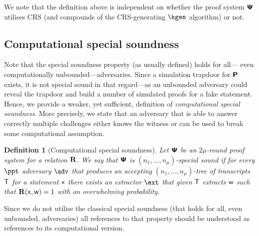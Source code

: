 \let\accentvec\vec \documentclass[runningheads,10pt]{llncs}
\newtheorem{definition}[theorem]{Definition}
\begin{document}
We note that the definition above is independent on whether the proof system $\bm{\mathsf{\Psi}}$ utilises CRS (and compounds of the CRS-generating $\kgen$ algorithm) or not.

\subsection{Computational special soundness}
Note that the special soundness property (as usually defined) holds for all--- even computationally unbounded---adversaries. Since a simulation trapdoor for $\bm{\mathsf{P}}$ exists, it is not special sound in that regard---as an unbounded adversary could reveal the trapdoor and build a number of simulated proofs for a fake statement. 
Hence, we provide a weaker, yet sufficient, definition of \emph{computational special soundness}. More precisely, we state that an adversary that is able to answer correctly multiple challenges either knows the witness or can be used to break some computational assumption. 

\begin{definition}[Computational special soundness]
	Let $\bm{\mathsf{\Psi}}$ be an $2 \mu$-round proof system for a relation $\mathbf{R}$. 
	We say that $\bm{\mathsf{\Psi}}$ is $(n_1, \ldots, n_\mu)$-\emph{special sound} if for every $\ppt$ adversary $\adv$ that produces an accepting $(n_1, \ldots, n_\mu)$-tree of transcripts $\mathsf{T}$ for a statement $\mathsf{x}$ there exists an extractor $\ext$ that given $\mathsf{T}$ extracts $\mathsf{w}$ such that $\mathbf{R}(\mathsf{x}, \mathsf{w}) = 1$ with an overwhelming probability.
\end{definition}

Since we do not utilise the classical special soundness (that holds for all, even unbounded, adversaries) all references to that property should be understood as references to its computational version.

\end{document}
